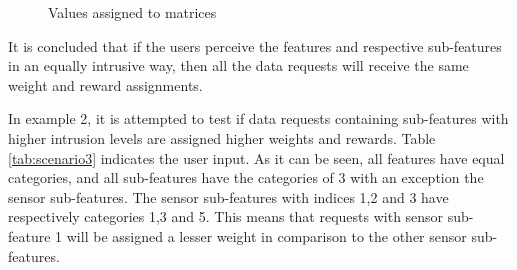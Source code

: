 \begin{figure}[htp]
  \hspace{1em}
  \caption{Values assigned to matrices}
  \label{fig:scenatio11}
\end{figure}

%

It is concluded that if the users perceive the features and respective sub-features in an equally intrusive way, then all the
data requests will receive the same weight and reward assignments.

In example 2, it is attempted to test if data requests containing sub-features with higher intrusion levels are assigned higher weights and rewards.
Table \ref{tab:scenario3} indicates the user input. As it can be seen, all features have equal categories, and
all sub-features have the categories of 3 with an exception the sensor sub-features. The sensor sub-features with indices 1,2 and 3 have respectively categories 1,3 and 5. This means that requests with sensor sub-feature 1 will be assigned a lesser weight in comparison to the other sensor sub-features. 

